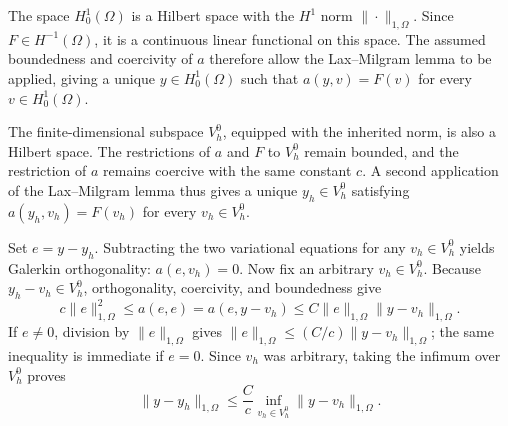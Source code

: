 \documentclass{article}
\begin{document}
The space \(H^1_0(\Omega)\) is a Hilbert space with the \(H^1\) norm \(\|\cdot\|_{1,\Omega}\). Since \(F\in H^{-1}(\Omega)\), it is a continuous linear functional on this space. The assumed boundedness and coercivity of \(a\) therefore allow the Lax--Milgram lemma to be applied, giving a unique \(y\in H^1_0(\Omega)\) such that \(a(y,v)=F(v)\) for every \(v\in H^1_0(\Omega)\).

The finite-dimensional subspace \(V_h^0\), equipped with the inherited norm, is also a Hilbert space. The restrictions of \(a\) and \(F\) to \(V_h^0\) remain bounded, and the restriction of \(a\) remains coercive with the same constant \(c\). A second application of the Lax--Milgram lemma thus gives a unique \(y_h\in V_h^0\) satisfying \(a(y_h,v_h)=F(v_h)\) for every \(v_h\in V_h^0\).

Set \(e=y-y_h\). Subtracting the two variational equations for any \(v_h\in V_h^0\) yields Galerkin orthogonality: \(a(e,v_h)=0\). Now fix an arbitrary \(v_h\in V_h^0\). Because \(y_h-v_h\in V_h^0\), orthogonality, coercivity, and boundedness give
\[
c\|e\|_{1,\Omega}^2\leq a(e,e)=a(e,y-v_h)\leq C\|e\|_{1,\Omega}\|y-v_h\|_{1,\Omega}.
\]
If \(e\neq0\), division by \(\|e\|_{1,\Omega}\) gives \(\|e\|_{1,\Omega}\leq(C/c)\|y-v_h\|_{1,\Omega}\); the same inequality is immediate if \(e=0\). Since \(v_h\) was arbitrary, taking the infimum over \(V_h^0\) proves
\[
\|y-y_h\|_{1,\Omega}\leq\frac{C}{c}\inf_{v_h\in V_h^0}\|y-v_h\|_{1,\Omega}.
\]
\end{document}
